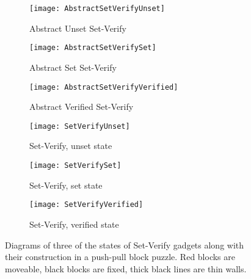 \begin{figure}[!ht]
  \centering
    \begin{subfigure}[b]{0.3\textwidth}
    \texttt{[image: AbstractSetVerifyUnset]}
    \caption{Abstract Unset Set-Verify}
    \vspace{15pt}
    \end{subfigure}
    \hfill
    \begin{subfigure}[b]{0.3\textwidth}
    \texttt{[image: AbstractSetVerifySet]}
    \caption{Abstract Set Set-Verify}
    \vspace{15pt}
    \end{subfigure}
    \hfill
    \begin{subfigure}[b]{0.33\textwidth}
    \texttt{[image: AbstractSetVerifyVerified]}
    \caption{Abstract Verified Set-Verify}
    \vspace{15pt}
  \end{subfigure}  
   \vspace{10pt}
  \begin{subfigure}[b]{0.3\textwidth}
    \texttt{[image: SetVerifyUnset]}
    \caption{Set-Verify, unset state}
    \label{SetVerifyUnset}
  \end{subfigure}
  \hfill
  \begin{subfigure}[b]{0.3\textwidth}
    \texttt{[image: SetVerifySet]}
    \caption{Set-Verify, set state}
    \label{SetVerifySet}
  \end{subfigure}
  \hfill
  \begin{subfigure}[b]{0.3\textwidth}
    \texttt{[image: SetVerifyVerified]}
    \caption{Set-Verify, verified state}
    \label{SetVerifyVerified}
  \end{subfigure}
  \caption{Diagrams of three of the states of Set-Verify gadgets along with their construction in a push-pull block puzzle. Red blocks are moveable, black blocks are fixed, thick black lines are thin walls.}
  \label{setVerifyDiagrams}
\end{figure}


